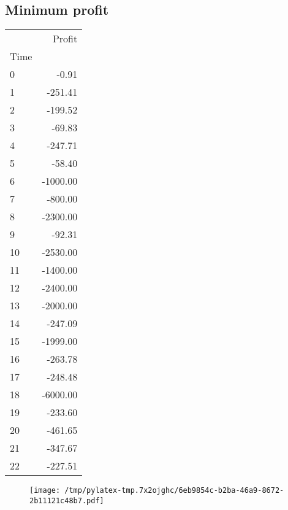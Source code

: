 \documentclass{article}%
\begin{document}
\subsection{Minimum profit }%
\label{subsec:Minimumprofit}%
\begin{tabular}{lr}
\toprule
{} &   Profit \\
Time &          \\
\midrule
0    &    -0.91 \\
1    &  -251.41 \\
2    &  -199.52 \\
3    &   -69.83 \\
4    &  -247.71 \\
5    &   -58.40 \\
6    & -1000.00 \\
7    &  -800.00 \\
8    & -2300.00 \\
9    &   -92.31 \\
10   & -2530.00 \\
11   & -1400.00 \\
12   & -2400.00 \\
13   & -2000.00 \\
14   &  -247.09 \\
15   & -1999.00 \\
16   &  -263.78 \\
17   &  -248.48 \\
18   & -6000.00 \\
19   &  -233.60 \\
20   &  -461.65 \\
21   &  -347.67 \\
22   &  -227.51 \\
\bottomrule
\end{tabular}
%


\begin{figure}[htbp]%
\centering%
\texttt{[image: /tmp/pylatex-tmp.7x2ojghc/6eb9854c-b2ba-46a9-8672-2b11121c48b7.pdf]}%
\end{figure}

%
\newpage %
\end{document}
